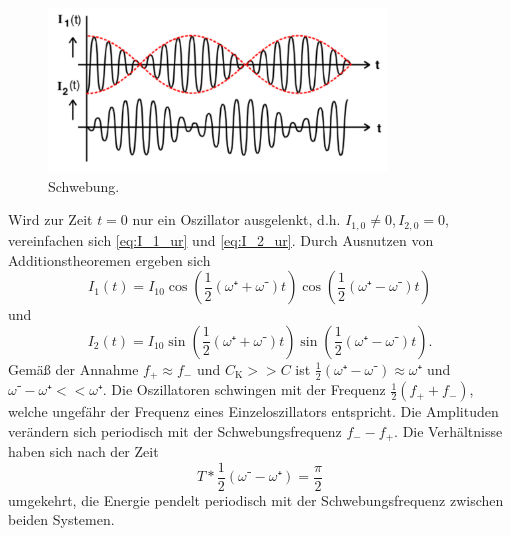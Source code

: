 \begin{figure}[h]
	\centering
	\includegraphics[width=0.8\textwidth]{Bilder/Schwebung.pdf}
		\caption{Schwebung. \cite{v355}}
		\label{fig:schwebung}
\end{figure}

Wird zur Zeit $t=0$ nur ein Oszillator ausgelenkt, d.h. $I_{1,0}\neq0$,\,$I_{2,0}=0$, vereinfachen sich \eqref{eq:I_1_ur} und \eqref{eq:I_2_ur}. 
Durch Ausnutzen von Additionstheoremen ergeben sich
\begin{equation}
	I_1(t)=I_{10}\cos(\frac{1}{2}(\omega⁺+\omega⁻)t)\cos(\frac{1}{2}(\omega⁺-\omega⁻)t)
\end{equation}
und
\begin{equation}
	I_2(t)=I_{10}\sin(\frac{1}{2}(\omega⁺+\omega⁻)t)\sin(\frac{1}{2}(\omega⁺-\omega⁻)t).
\end{equation}
Gemäß der Annahme $f_+\approx f_-$ und $C_\mathup{K}>>C$ ist $\frac{1}{2}(\omega⁺-\omega⁻)\approx\omega⁺$ und $\omega⁻-\omega⁺<<\omega⁺$.
Die Oszillatoren schwingen mit der Frequenz $\frac{1}{2}(f_+ + f_-)$, welche ungefähr der Frequenz eines Einzeloszillators entspricht. 
Die Amplituden verändern sich periodisch mit der Schwebungsfrequenz $f_- - f_+$. 
Die Verhältnisse haben sich nach der Zeit 
\begin{equation}
T*\frac{1}{2}({\omega⁻-\omega⁺})=\frac{\pi}{2}
\end{equation}
 umgekehrt, die Energie pendelt periodisch mit der Schwebungsfrequenz zwischen beiden Systemen.

\newpage
